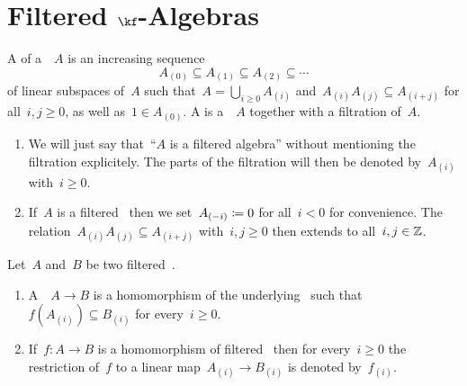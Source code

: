 \section{Filtered \texorpdfstring{$\kf$}{k}-Algebras}


\begin{definition}
  A  of a~\algebra{$\kf$}~$A$ is an increasing sequence
  \[
    A_{(0)}
    \subseteq
    A_{(1)}
    \subseteq
    A_{(2)}
    \subseteq
    \dotsb
  \]
  of linear subspaces of~$A$ such that~$A = \bigcup_{i \geq 0} A_{(i)}$ and~$A_{(i)} A_{(j)} \subseteq A_{(i+j)}$ for all~$i,j \geq 0$, as well as~$1 \in A_{(0)}$.
  A  is a~\algebra{$\kf$}~$A$ together with a filtration of~$A$.
\end{definition}


\begin{remark}
  \label{filtration conventions}
  \leavevmode
  \begin{enumerate}
    \item
      We will just say that~\enquote{$A$ is a filtered algebra} without mentioning the filtration explicitely.
      The parts of the filtration will then be denoted by~$A_{(i)}$ with~$i \geq 0$.
    \item
      If~$A$ is a filtered~{\algebra{$\kf$}} then we set~$A_{(-i)} \coloneqq 0$ for all~$i < 0$ for convenience.
      The relation~$A_{(i)} A_{(j)} \subseteq A_{(i+j)}$ with~$i,j \geq 0$ then extends to all~$i, j \in \mathbb{Z}$.
  \end{enumerate}
\end{remark}


\begin{definition}
  Let~$A$ and~$B$ be two filtered~\algebras{$\kf$}.
  \begin{enumerate}
    \item
      A~~$A \to B$ is a homomorphism of the underlying~{\algebras{$\kf$}} such that~$f(A_{(i)}) \subseteq B_{(i)}$ for every~$i \geq 0$.
    \item
      If~$f \colon A \to B$ is a homomorphism of filtered~{\algebras{$\kf$}} then for every~$i \geq 0$ the restriction of~$f$ to a linear map~$A_{(i)} \to B_{(i)}$ is denoted by~$f_{(i)}$.
  \end{enumerate}
\end{definition}


